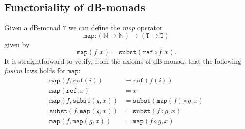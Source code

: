 \documentclass[a4paper,twoside,12pt]{article}
\newtheorem{proposition}{Proposition}
\theoremstyle{definition}
\theoremstyle{remark}
\theoremstyle{example}
\newcommand{\NN}{\mathbb{N}}
\newcommand{\TT}{\mathtt{T}}
\newcommand{\subst}{\mathtt{subst}}
\newcommand{\refe}{\mathtt{ref}}
\newcommand{\map}{\mathtt{map}}
\begin{document}




\subsection{Functoriality of dB-monads}
\label{sec:further-operators-db}

Given a dB-monad $\TT$ we can define the \emph{map} operator
\begin{equation*}
  \map\colon (\NN \to \NN) \to (\TT \to \TT)
\end{equation*}
given by
\begin{equation*}
  \map(f,x) = \subst(\refe \circ f, x).
\end{equation*}
It is straightforward to verify, from the axioms of dB-monad, that the
following \emph{fusion} laws holds for $\map$:
\begin{align*}
  \map(f,\refe(i)) &= \refe(f(i)) \\
  \map(\refe,x) &= x \\
  \map(f,\subst(g,x)) &= \subst(\map(f) \circ g, x) \\
  \subst(f,\map(g,x)) &= \subst(f \circ g,x) \\
  \map(f,\map(g,x)) &= \map(f\circ g, x) \\
\end{align*}
\end{document}
